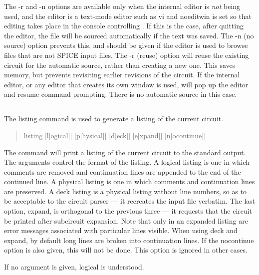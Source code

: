 The {\vt -r} and {\vt -n} options are available only when the internal
editor is {\it not} being used, and the editor is a text-mode editor
such as {\vt vi} and {\et noeditwin} is set so that editing takes
place in the console controlling {\WRspice}.  If this is the case,
after quitting the editor, the file will be sourced automatically if
the text was saved.  The {\vt -n} (no source) option prevents this,
and should be given if the editor is used to browse files that are not
SPICE input files.  The {\vt -r} (reuse) option will reuse the
existing circuit for the automatic source, rather than creating a new
one.  This saves memory, but prevents revisiting earlier revisions of
the circuit.  If the internal editor, or any editor that creates its
own window is used, {\WRspice} will pop up the editor and resume
command prompting.  There is no automatic source in this case.

\subsection{}


The {\cb listing} command is used to generate a listing of the current
circuit.
\begin{quote}\vt
listing [l[ogical]] [p[hysical]] [d[eck]] [e[xpand]] [n[ocontinue]]
\end{quote}
The command will print a listing of the current circuit to the
standard output.  The arguments control the format of the listing.  A
{\vt logical} listing is one in which comments are removed and
continuation lines are appended to the end of the continued line.  A
{\vt physical} listing is one in which comments and continuation lines
are preserved.  A {\vt deck} listing is a {\vt physical} listing
without line numbers, so as to be acceptable to the circuit parser ---
it recreates the input file verbatim.  The last option, {\vt expand},
is orthogonal to the previous three --- it requests that the circuit
be printed after subcircuit expansion.  Note that only in an expanded
listing are error messages associated with particular lines visible. 
When using {\vt deck} and {\vt expand}, by default long lines are
broken into continuation lines.  If the {\vt nocontinue} option is
also given, this will not be done.  This option is ignored in other
cases.

If no argument is given, {\vt logical} is understood.

